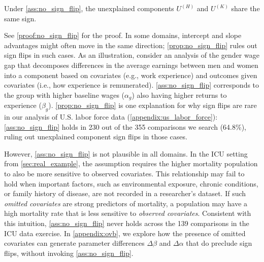\begin{proposition}
    \label{prop:no_sign_flip}
    Under \cref{ass:no_sign_flip}, the unexplained components 
    \( U^{(H)}\) and  \(U^{(K)}\) share the same sign.
\end{proposition}
See \cref{proof:no_sign_flip} for the proof.
In some domains, intercept and slope advantages might often move in the same direction; 
\cref{prop:no_sign_flip} rules out sign flips in such cases.
As an illustration, consider an analysis of the gender wage gap that decomposes differences in the average earnings between men and women into a component based on covariates (e.g., work experience) and outcomes given covariates (i.e., how experience is remunerated).
\cref{ass:no_sign_flip} corresponds to the group with higher baseline wages ($\alpha_g$) also having higher returns to experience ($\beta_g$). 
\cref{prop:no_sign_flip} is one explanation for why sign flips are rare in our analysis of U.S. labor force data (\cref{appendix:us_labor_force}): \cref{ass:no_sign_flip} holds in 230 out of the 355 comparisons we search (64.8\%), ruling out unexplained component sign flips in those cases.

However, \cref{ass:no_sign_flip} is not plausible in all domains.
In the ICU setting from \cref{sec:real_example}, the assumption requires the higher mortality population to also be more sensitive to observed covariates.
This relationship may fail to hold when important factors, such as environmental exposure, chronic conditions, or family history of disease, are not recorded in a researcher's dataset.
If such \textit{omitted covariates} are strong predictors of mortality, a population may have a high mortality rate that is less sensitive to \textit{observed covariates}.
Consistent with this intuition, \cref{ass:no_sign_flip} never holds across the 139 comparisons in the ICU data exercise.
In \cref{appendix:ovb}, we explore how the presence of omitted covariates can generate parameter differences $\Delta\beta$ and $\Delta\alpha$ that do preclude sign flips, without invoking \cref{ass:no_sign_flip}.

